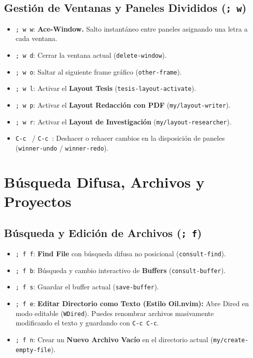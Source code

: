 \documentclass[11pt,book,spanish,alphabetic]{apuntes-scr}
\begin{document}
\section{Gestión de Ventanas y Paneles Divididos (\texttt{; w})}
\begin{itemize}[leftmargin=8mm]
    \item \texttt{; w w}: \textbf{Ace-Window.} Salto instantáneo entre paneles asignando una letra a cada ventana.
    \item \texttt{; w d}: Cerrar la ventana actual (\texttt{delete-window}).
    \item \texttt{; w o}: Saltar al siguiente frame gráfico (\texttt{other-frame}).
    \item \texttt{; w l}: Activar el \textbf{Layout Tesis} (\texttt{tesis-layout-activate}).
    \item \texttt{; w p}: Activar el \textbf{Layout Redacción con PDF} (\texttt{my/layout-writer}).
    \item \texttt{; w r}: Activar el \textbf{Layout de Investigación} (\texttt{my/layout-researcher}).
    \item \texttt{C-c \string\leftarrow} / \texttt{C-c \string\rightarrow}: Deshacer o rehacer cambios en la disposición de paneles (\texttt{winner-undo} / \texttt{winner-redo}).
\end{itemize}

\chapter{Búsqueda Difusa, Archivos y Proyectos}

\section{Búsqueda y Edición de Archivos (\texttt{; f})}
\begin{itemize}[leftmargin=8mm]
    \item \texttt{; f f}: \textbf{Find File} con búsqueda difusa no posicional (\texttt{consult-find}).
    \item \texttt{; f b}: Búsqueda y cambio interactivo de \textbf{Buffers} (\texttt{consult-buffer}).
    \item \texttt{; f s}: Guardar el buffer actual (\texttt{save-buffer}).
    \item \texttt{; f e}: \textbf{Editar Directorio como Texto (Estilo Oil.nvim):} Abre Dired en modo editable (\texttt{WDired}). Puedes renombrar archivos masivamente modificando el texto y guardando con \texttt{C-c C-c}.
    \item \texttt{; f n}: Crear un \textbf{Nuevo Archivo Vacío} en el directorio actual (\texttt{my/create-empty-file}).
\end{itemize}
\end{document}
